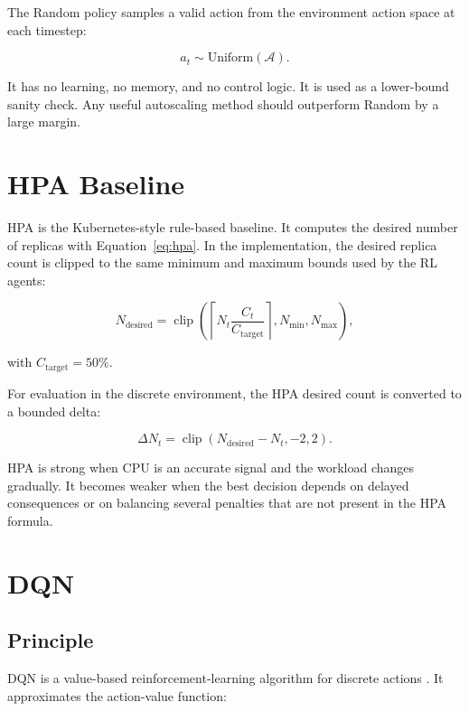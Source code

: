 \documentclass{rapportINPTCLOUD}
\begin{document}
The Random policy samples a valid action from the environment action space at each timestep:

\begin{equation}
a_t \sim \text{Uniform}(\mathcal{A}).
\end{equation}

It has no learning, no memory, and no control logic. It is used as a lower-bound sanity check. Any useful autoscaling method should outperform Random by a large margin.

\section{HPA Baseline}

HPA is the Kubernetes-style rule-based baseline. It computes the desired number of replicas with Equation~\ref{eq:hpa}. In the implementation, the desired replica count is clipped to the same minimum and maximum bounds used by the RL agents:

\begin{equation}
N_{\text{desired}}
=
\operatorname{clip}
\left(
\left\lceil
N_t
\frac{C_t}{C_{\text{target}}}
\right\rceil,
N_{\min},
N_{\max}
\right),
\end{equation}

with $C_{\text{target}}=50\%$.

For evaluation in the discrete environment, the HPA desired count is converted to a bounded delta:

\begin{equation}
\Delta N_t =
\operatorname{clip}
\left(
N_{\text{desired}} - N_t,
-2,
2
\right).
\end{equation}

HPA is strong when CPU is an accurate signal and the workload changes gradually. It becomes weaker when the best decision depends on delayed consequences or on balancing several penalties that are not present in the HPA formula.

\section{DQN}

\subsection{Principle}

DQN is a value-based reinforcement-learning algorithm for discrete actions \cite{mnih2015}. It approximates the action-value function:
\end{document}
